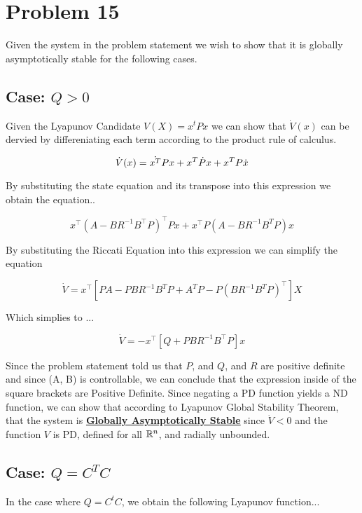 \section*{Problem 15}

Given the system in the problem statement we wish to show that it is globally asymptotically stable for the following cases.

\subsection*{Case: $Q>0 $}

Given the Lyapunov Candidate $V(X) = x^tPx$ we can show that $\dot{V}(x)$ can be dervied by differeniating each term according to the product rule of calculus.


$$
\dot{V}(x) = \dot{x^T}Px + x^T\dot{P}x + x^TP\dot{x} \\
$$

\noindent By substituting the state equation and its transpose into this expression we obtain the equation..

$$
x^{\top}\left(A-B R^{-1} B^{\top} P\right)^{\top} P x+x^{\top} P\left(A-B R^{-1} B^{T} P\right) x
$$

\noindent By substituting the Riccati Equation into this expression we can simplify the equation


$$
\dot{V}=x^{\top}\left[P A-P B R^{-1} B^{T} P+A^{T} P-P\left(B R^{-1} B^{T} P\right)^{\top}\right] X
$$

\noindent Which simplies to ...

$$
\dot{V}= -x^{\top}\left[Q+P B R^{-1} B^{\top} P\right] x
$$


\noindent Since the problem statement told us that $P$, and $Q$, and $R$ are positive definite and since (A, B) is controllable, we can conclude that the expression inside of the square brackets are Positive Definite. Since negating a PD function yields a ND function, we can show that according to Lyapunov Global Stability Theorem, that the system is \underline{\textbf{Globally Asymptotically Stable}} since $\dot{V}< 0$ and the function $V$ is PD, defined for all $\mathbb{R}^n$, and radially unbounded.




\subsection*{Case: $Q=C^TC $}

In the case where $Q = C^tC$, we obtain the following Lyapunov function...



